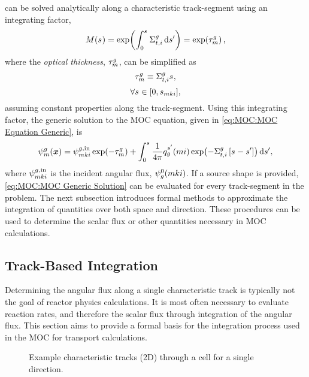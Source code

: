 {{         can be solved analytically along a characteristic track-segment using an integrating factor,
        \begin{equation}\label{eq:MOC:Integrating Factor}
            M(\len) = \exp\!\left(\intl[0][\len]\xst\dif{s'}\right) = \exp\!\left(\opt\right),
        \end{equation}
        where the \emph{optical thickness}, $\opt$, can be simplified as
        \begin{equation}\label{eq:MOC:Optical Thickness Definition}
            \opt \defined \xst\len,
        \end{equation}
        \begin{equation*}
          \forall \len \in [0,\segl],
        \end{equation*}
        assuming constant properties along the track-segment.
        Using this integrating factor, the generic solution to the \ac{MOC} equation, given in \cref{eq:MOC:MOC Equation Generic}, is
        \begin{equation}\label{eq:MOC:MOC Generic Solution}
            \aflux = \afluxin\exp\!\left(-\opt\right) + \intl[0][\len]\rfourpi\source[mi][g][\len']\exp\!\left(-\xst\left[\len-\len'\right]\right)\dif{s'},
        \end{equation}
        where $\afluxin$ is the incident angular flux, $\aflux[mki][g][0]$.
        If a source shape is provided, \cref{eq:MOC:MOC Generic Solution} can be evaluated for every track-segment in the problem.
        The next subsection introduces formal methods to approximate the integration of quantities over both space and direction.
        These procedures can be used to determine the scalar flux or other quantities necessary in \ac{MOC} calculations.

        \subsection{Track-Based Integration}{\label{ssec:MOC:Track-Based Integration}
            Determining the angular flux along a single characteristic track is typically not the goal of reactor physics calculations.
            It is most often necessary to evaluate reaction rates, and therefore the scalar flux through integration of the angular flux.
            This section aims to provide a formal basis for the integration process used in the \ac{MOC} for transport calculations.

            \begin{figure}[h]
                \centering
                \def\svgwidth{0.4\linewidth}
                
                \caption{Example characteristic tracks (2D) through a cell for a single direction.}
                \label{fig:MOC:MOC Tracks}
            \end{figure}

}}}
